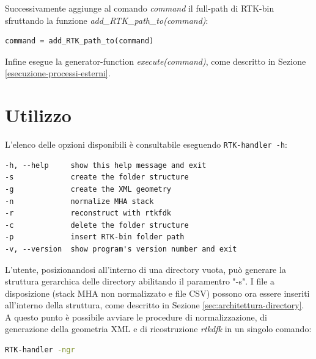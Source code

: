 \documentclass[a4paper,12pt, doubleside]{report}
\begin{document}
\begin{itemize}
                    Successivamente aggiunge al comando \textit{command} il full-path di RTK-bin sfruttando la funzione \textit{add\_RTK\_path\_to(command)}:
                        
                    \begin{lstlisting}[language=python, frame=bt]
command = add_RTK_path_to(command)
                        \end{lstlisting}
                        
                    Infine esegue la generator-function \textit{execute(command)}, come descritto in Sezione \ref{esecuzione-processi-esterni}.
                        
                \end{itemize}                    
        
        \section{Utilizzo}
        \label{sec:utilizzo}
        
            \par
                L'elenco delle opzioni disponibili è consultabile eseguendo \texttt{RTK-handler -h}:
                
                \bigskip
                \begin{lstlisting}[frame=bt]
-h, --help     show this help message and exit
-s             create the folder structure
-g             create the XML geometry
-n             normalize MHA stack
-r             reconstruct with rtkfdk
-c             delete the folder structure
-p             insert RTK-bin folder path
-v, --version  show program's version number and exit
                \end{lstlisting}
            
            \bigskip
            \par
                L'utente, posizionandosi all'interno di una directory vuota, può generare la struttura gerarchica delle directory abilitando il paramentro "-s". I file a disposizione (stack MHA non normalizzato e file CSV) possono ora essere inseriti all'interno della struttura, come descritto in Sezione \ref{sec:architettura-directory}. A questo punto è possibile avviare le procedure di normalizzazione, di generazione della geometria XML e di ricostruzione \textit{rtkdfk} in un singolo comando:
                
                \begin{lstlisting}[language=bash, frame=bt]
RTK-handler -ngr
                \end{lstlisting}
                
\end{document}
